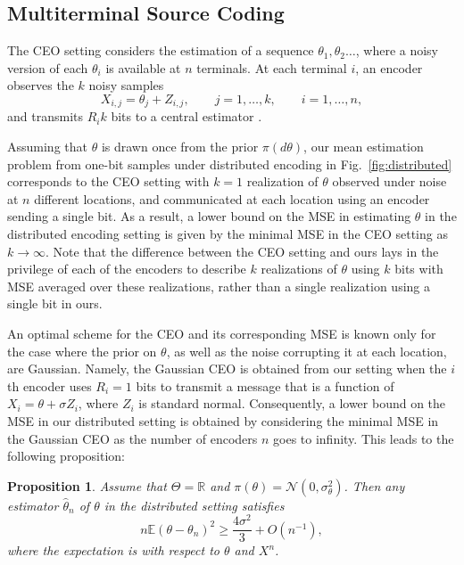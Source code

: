 \documentclass[letterpaper, 11pt]{IEEEtran}      %
\newtheorem{prop}[thm]{\bf {Proposition}}
\begin{document}
\subsection{Multiterminal Source Coding \label{sec:ceo}}
The CEO setting considers the estimation of a sequence $\theta_1,\theta_2\ldots$, where a noisy version of each $\theta_i$ is available at $n$ terminals. At each terminal $i$, an encoder observes the $k$ noisy samples
\[
X_{i,j} = \theta_j + Z_{i,j},\qquad j=1,\ldots,k, \qquad i = 1,\ldots,n,
\]
and transmits $R_i k$ bits to a central estimator  \cite{berger1996ceo}.  \par
%
Assuming that $\theta$ is drawn once from the prior $\pi(d\theta)$, our mean estimation problem from one-bit samples under distributed encoding in Fig.~\ref{fig:distributed} corresponds to the CEO setting with $k=1$ realization of $\theta$ observed under noise at $n$ different locations, and communicated at each location using an encoder sending a single bit. As a result, a lower bound on the MSE in estimating $\theta$ in the distributed encoding setting is given by the minimal MSE in the CEO setting as $k \to \infty$. Note that the difference between the CEO setting and ours lays in the privilege of each of the encoders to describe $k$ realizations of $\theta$ using $k$ bits with MSE averaged over these realizations, rather than a single realization using a single bit in ours. 
 \par
An optimal scheme for the CEO and its corresponding MSE is known only for the case where the prior on $\theta$, as well as the noise corrupting it at each location, are Gaussian. Namely, the Gaussian CEO is obtained from our setting when the $i$th encoder uses $R_i=1$ bits to transmit a message that is a function of $X_i = \theta + \sigma Z_i$, where $Z_i$ is standard normal. Consequently, a lower bound on the MSE in our distributed setting is obtained by considering the minimal MSE in the Gaussian CEO as the number of encoders $n$ goes to infinity. This leads to the following proposition:
\begin{prop} \label{prop:ceo_lower_bound}
Assume that $\Theta = \mathbb R$ and $\pi(\theta) = \mathcal N(0,\sigma_\theta^2)$. Then any estimator $\hat{\theta}_n$ of $\theta$ in the distributed setting satisfies
\begin{equation} \label{eq:ceo_bound}
 n\mathbb E \left( \theta - \theta_n \right)^2 \geq \frac{4\sigma^2}{3} + O(n^{-1}),
\end{equation}
where the expectation is with respect to $\theta$ and $X^n$.
\end{prop}
\end{document}
